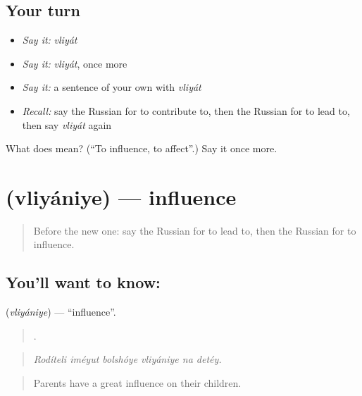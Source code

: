 \subsection*{Your turn}
\begin{itemize}
\raggedright
  \item \emph{Say it:} \emph{vliyát}
  \item \emph{Say it:} \emph{vliyát}, once more
  \item \emph{Say it:} a sentence of your own with \emph{vliyát}
  \item \emph{Recall:} say the Russian for to contribute to, then the Russian for to lead to, then say \emph{vliyát} again
\end{itemize}

\begin{tcolorbox}[breakable,colback=teal!4,colframe=teal!35!black,title={Before you move on}]
What does  mean? (\textquotedblleft{}To influence, to affect\textquotedblright{}.) Say it once more.
\end{tcolorbox}
\section[\texorpdfstring{\ru{влияние} (vliyániye)}{влияние (vliyániye)}]{ (vliyániye) — influence}

\label{lesson:RU-C349-vliyanie}



\begin{quote}
Before the new one: say the Russian for to lead to, then the Russian for to influence.
\end{quote}

\subsection*{You'll want to know: }
\textbf{} (\emph{vliyániye}) — \textquotedblleft{}influence\textquotedblright{}.

\begin{quote}
     .
\end{quote}

\begin{quote}
\emph{Rodíteli iméyut bolshóye vliyániye na detéy.}
\end{quote}

\begin{quote}
Parents have a great influence on their children.
\end{quote}

